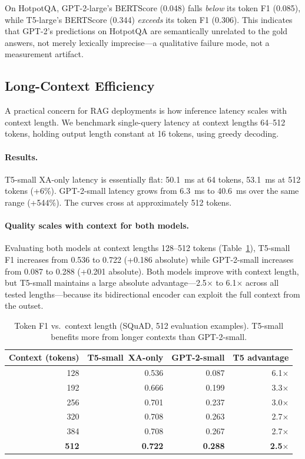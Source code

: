 \documentclass[11pt]{article}
\newcommand{\tssmall}{T5-small\xspace}
\newcommand{\gptsmall}{GPT-2-small\xspace}
\newcommand{\xaonly}{XA-only\xspace}
\newcommand{\squad}{SQuAD\xspace}
\newcommand{\hotpotqa}{HotpotQA\xspace}
\begin{document}
On \hotpotqa, GPT-2-large's BERTScore (0.048) falls \emph{below} its token F1
(0.085), while T5-large's BERTScore (0.344) \emph{exceeds} its token F1 (0.306).
This indicates that GPT-2's predictions on \hotpotqa are semantically unrelated
to the gold answers, not merely lexically imprecise---a qualitative failure mode,
not a measurement artifact.

\subsection{Long-Context Efficiency}
\label{sec:latency}

A practical concern for RAG deployments is how inference latency scales with
context length.
We benchmark single-query latency at context lengths 64--512 tokens,
holding output length constant at 16 tokens, using greedy decoding.

\paragraph{Results.}
T5-small \xaonly latency is essentially flat: 50.1~ms at 64 tokens, 53.1~ms
at 512 tokens (+6\%).
GPT-2-small latency grows from 6.3~ms to 40.6~ms over the same range (+544\%).
The curves cross at approximately 512 tokens.

\paragraph{Quality scales with context for both models.}
Evaluating both models at context lengths 128--512 tokens
(Table~\ref{tab:context-quality}), T5-small F1 increases from 0.536 to 0.722
(+0.186 absolute) while GPT-2-small increases from 0.087 to 0.288 (+0.201 absolute).
Both models improve with context length, but \tssmall maintains a large absolute
advantage---2.5$\times$ to 6.1$\times$ across all tested lengths---because its
bidirectional encoder can exploit the full context from the outset.

\begin{table}[t]
  \centering
  \small
  \caption{Token F1 vs.\ context length (\squad, 512 evaluation examples).
  T5-small benefits more from longer contexts than GPT-2-small.}
  \label{tab:context-quality}
  \begin{tabular}{rrrr}
    \toprule
    Context (tokens) & \tssmall~\xaonly & \gptsmall & T5 advantage \\
    \midrule
    128 & 0.536 & 0.087 & 6.1$\times$ \\
    192 & 0.666 & 0.199 & 3.3$\times$ \\
    256 & 0.701 & 0.237 & 3.0$\times$ \\
    320 & 0.708 & 0.263 & 2.7$\times$ \\
    384 & 0.708 & 0.267 & 2.7$\times$ \\
    \textbf{512} & \textbf{0.722} & \textbf{0.288} & \textbf{2.5$\times$} \\
    \bottomrule
  \end{tabular}
\end{table}
\end{document}
